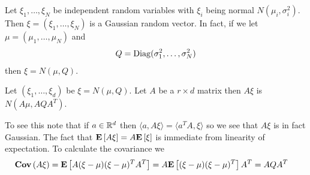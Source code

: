 \begin{examp}Let $\xi_1, \dots, \xi_N$ be independent random variables
  with $\xi_i$ being normal $N(\mu_i, \sigma_i^2)$.  Then $\xi =
  (\xi_1, \dots, \xi_N)$ is a Gaussian random vector.  In fact, if we
  let $\mu = (\mu_1, \dots, \mu_N)$ and 
\begin{align*}
Q = \operatorname*{Diag}(\sigma_1^2, \dots, \sigma_N^2)
\end{align*}
then $\xi = N(\mu, Q)$.
\end{examp}

\begin{examp}\label{LinearTransformationGaussian}Let $(\xi_1, \dots, \xi_d)$ be $\xi = N(\mu, Q)$.  Let
  $A$ be a $r \times d$ matrix then $A \xi$ is $N( A \mu, A Q
  A^T)$.

To see this note that if $a \in \mathbb{R}^d$ then $\langle a , A \xi
\rangle = \langle a^T A, \xi \rangle$ so we see that $A \xi$ is in
fact Gaussian.  The fact that $\textbf{E}\left[A \xi\right] =
A\textbf{E}\left[\xi\right]$ is immediate from linearity of expectation.  To
calculate the covariance we 
\begin{align*}
\textbf{Cov} \left (A\xi \right ) &= \textbf{E}\left[A(\xi - \mu) (\xi - \mu)^T A^T\right] =
A\textbf{E}\left[(\xi - \mu) (\xi - \mu)^T\right]A^T = 
A Q A^T
\end{align*}
\end{examp}

